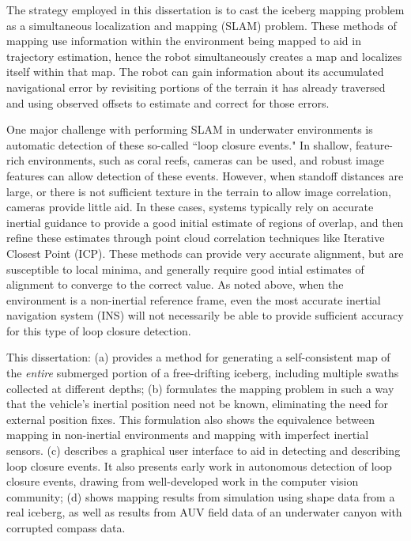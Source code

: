 The strategy employed in this dissertation is to cast the iceberg mapping problem as a simultaneous localization and mapping (SLAM) problem. These methods of mapping use information within the environment being mapped to aid in trajectory estimation, hence the robot simultaneously creates a map and localizes itself within that map. The robot can gain information about its accumulated navigational error by revisiting portions of the terrain it has already traversed and using observed offsets to estimate and correct for those errors. 

One major challenge with performing SLAM in underwater environments is automatic detection of these so-called ``loop closure events." In shallow, feature-rich environments, such as coral reefs, cameras can be used, and robust image features can allow detection of these events. However, when standoff distances are large, or there is not sufficient texture in the terrain to allow image correlation, cameras provide little aid. In these cases, systems typically rely on accurate inertial guidance to provide a good initial estimate of regions of overlap, and then refine these estimates through point cloud correlation techniques like Iterative Closest Point (ICP). These methods can provide very accurate alignment, but are susceptible to local minima, and generally require good intial estimates of alignment to converge to the correct value. As noted above, when the environment is a non-inertial reference frame, even the most accurate inertial navigation system (INS) will not necessarily be able to provide sufficient accuracy for this type of loop closure detection. 

This dissertation: (a) provides a method for generating a self-consistent map of the \emph{entire} submerged portion of a free-drifting iceberg, including multiple swaths collected at different depths; (b) formulates the mapping problem in such a way that the vehicle's inertial position need not be known, eliminating the need for external position fixes. This formulation also shows the equivalence between mapping in non-inertial environments and mapping with imperfect inertial sensors. (c) describes a graphical user interface to aid in detecting and describing loop closure events. It also presents early work in autonomous detection of loop closure events, drawing from well-developed work in the computer vision community; (d) shows mapping results from simulation using shape data from a real iceberg, as well as results from AUV field data of an underwater canyon with corrupted compass data. 



